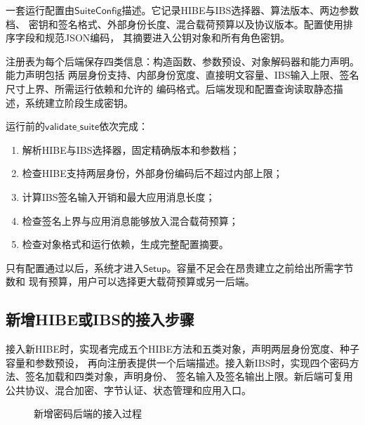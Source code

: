 一套运行配置由$\mathsf{SuiteConfig}$描述。它记录HIBE与IBS选择器、算法版本、两边参数档、
密钥和签名格式、外部身份长度、混合载荷预算以及协议版本。配置使用排序字段和规范JSON编码，
其摘要进入公钥对象和所有角色密钥。

注册表为每个后端保存四类信息：构造函数、参数预设、对象解码器和能力声明。能力声明包括
两层身份支持、内部身份宽度、直接明文容量、IBS输入上限、签名尺寸上界、所需运行依赖和允许的
编码格式。后端发现和配置查询读取静态描述，系统建立阶段生成密钥。

运行前的$\mathsf{validate\_suite}$依次完成：
\begin{enumerate}
  \item 解析HIBE与IBS选择器，固定精确版本和参数档；
  \item 检查HIBE支持两层身份，外部身份编码后不超过内部上限；
  \item 计算IBS签名输入开销和最大应用消息长度；
  \item 检查签名上界与应用消息能够放入混合载荷预算；
  \item 检查对象格式和运行依赖，生成完整配置摘要。
\end{enumerate}
只有配置通过以后，系统才进入$\mathsf{Setup}$。容量不足会在昂贵建立之前给出所需字节数和
现有预算，用户可以选择更大载荷预算或另一后端。

\subsection{新增HIBE或IBS的接入步骤}

接入新HIBE时，实现者完成五个HIBE方法和五类对象，声明两层身份宽度、种子容量和参数预设，
再向注册表提供一个后端描述。接入新IBS时，实现四个密码方法、签名加载和四类对象，声明身份、
签名输入及签名输出上限。新后端可复用公共协议、混合加密、字节认证、状态管理和应用入口。

\begin{figure}[H]
\centering
{}
\caption{新增密码后端的接入过程}
\label{fig:new-backend}
\end{figure}

